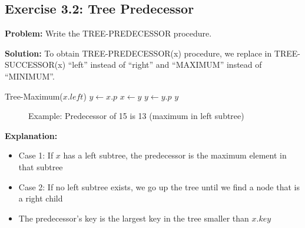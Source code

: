 \subsection{Exercise 3.2: Tree Predecessor}
\textbf{Problem:} Write the TREE-PREDECESSOR procedure.

\textbf{Solution:} To obtain TREE-PREDECESSOR(x) procedure, we replace in TREE-SUCCESSOR(x) ``left'' instead of ``right'' and ``MAXIMUM'' instead of ``MINIMUM''.

\begin{algorithm}[H]
\begin{algorithmic}[1]
        \State \Return Tree-Maximum($x.left$)
    \EndIf
    \State $y \gets x.p$
        \State $x \gets y$
        \State $y \gets y.p$
    \EndWhile
    \State \Return $y$
\EndProcedure
\end{algorithmic}
\end{algorithm}

\begin{figure}[H]
    \centering
    \caption*{\footnotesize Example: Predecessor of 15 is 13 (maximum in left subtree)}
\end{figure}

\textbf{Explanation:}
\begin{itemize}
    \item Case 1: If $x$ has a left subtree, the predecessor is the maximum element in that subtree
    \item Case 2: If no left subtree exists, we go up the tree until we find a node that is a right child
    \item The predecessor's key is the largest key in the tree smaller than $x.key$
\end{itemize}


